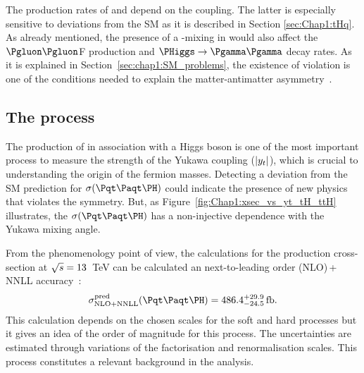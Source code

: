 
The production rates of \ttH and \tH depend on the \yt coupling. The latter
is especially sensitive to \yt deviations from the SM as it is described in Section
\ref{sec:Chap1:tHq}. As already mentioned, the presence of a \CP-mixing in \yt would also affect the
$\Pgluon \Pgluon$F production and $\PHiggs \rightarrow \Pgamma \Pgamma$ decay rates.
As it is explained in Section~\ref{sec:chap1:SM_problems}, the existence of \CP violation is
one of the conditions needed to explain the matter-antimatter asymmetry~\cite{Sakharov:1967dj}.



\subsection{The \ttH process}
\label{sec:Chap1:ttH}
The production of \ttbar in association with a Higgs boson is one of the most important process
to measure the strength of the Yukawa coupling ($|y_{t}|$), which is crucial to understanding the origin of the fermion masses.
Detecting a deviation from the SM prediction for $\sigma(\ttH)$ could indicate the presence of new physics that
violates the \CP symmetry. But, as Figure~\ref{fig:Chap1:xsec_vs_yt_tH_ttH} illustrates, the  $\sigma(\ttH)$ has
a non-injective dependence with the Yukawa mixing angle.


From the phenomenology point of view, the calculations for the \ttH production cross-section
at $\sqrt{s}=13$~TeV can be calculated an next-to-leading order
(NLO)$\,$+$\,$NNLL
accuracy~\cite{Broggio:2016lfj}:
\begin{equation*}
	\sigma_{\text{NLO+NNLL}}^{\text{pred}} (\ttH) = 486.4^{+29.9}_{-24.5}\,\text{fb}.
\end{equation*}
This calculation depends on the chosen scales for the soft and hard processes but it gives an idea of the order 
of magnitude for this process. The uncertainties are estimated through variations of the factorisation and
renormalisation scales.
This process constitutes a relevant background in the analysis. %

